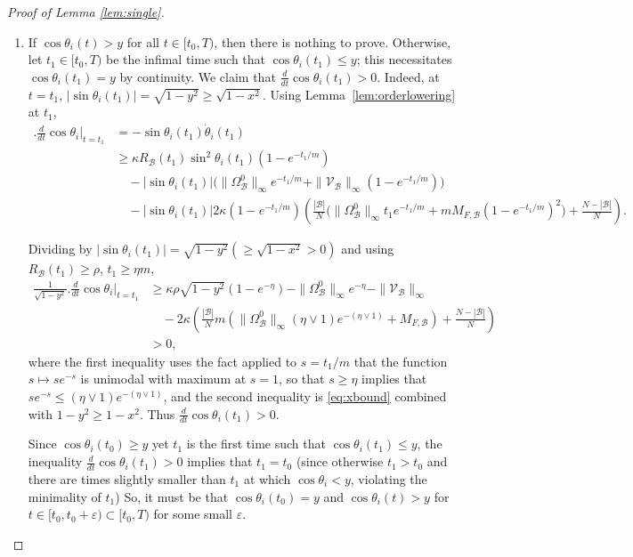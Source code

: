 \documentclass[11pt,reqno]{amsart}
\theoremstyle{definition}
\theoremstyle{remark}
\begin{document}
\begin{proof}[Proof of Lemma \ref{lem:single}]
	\,
\begin{enumerate}
\item 
If $\cos\theta_i(t)>y$ for all $t\in [t_0,T)$, then there is nothing to prove. Otherwise, let $t_1\in[t_0,T)$ be the infimal time  such that
$\cos\theta_i(t_1)\le y$; this necessitates $\cos\theta_i(t_1)=y$ by continuity. We claim that $\frac{d}{dt}\cos\theta_i(t_1)>0$. Indeed, at $t=t_1$, $|\sin\theta_i(t_1)|=\sqrt{1-y^2}\ge\sqrt{1-x^2}$. Using
Lemma~\ref{lem:orderlowering} at $t_1$,
\begin{align*}
\bigl.\tfrac{d}{dt}\cos\theta_i\bigr|_{t=t_1}
&=-\sin\theta_i(t_1)\dot\theta_i(t_1)\\
&\ge \kappa R_\mathcal{B}(t_1)\sin^2\theta_i(t_1)(1-e^{-t_1/m})\\
&\quad-|\sin\theta_i(t_1)|\bigl(\|\Omega_\mathcal{B}^0\|_\infty e^{-t_1/m}+\|\mathcal V_\mathcal{B}\|_\infty(1-e^{-t_1/m})\bigr)\\
&\quad-|\sin\theta_i(t_1)|2\kappa (1-e^{-t_1/m})\left(\frac{|\mathcal{B}|}{N}\bigl(\|\Omega_\mathcal{B}^0\|_\infty t_1 e^{-t_1/m}+m M_{F,\mathcal{B}}(1-e^{-t_1/m})^2\bigr)+\frac{N-|\mathcal{B}|}{N}\right).
\end{align*}

Dividing by $|\sin\theta_i(t_1)|=\sqrt{1-y^2}(\ge\sqrt{1-x^2}>0)$ and using
$R_\mathcal{B}(t_1)\ge\rho$, $t_1\ge\eta m$,
\begin{align*}
\frac{1}{\sqrt{1-y^2}}\bigl.\tfrac{d}{dt}\cos\theta_i\bigr|_{t=t_1}
&\ge \kappa\rho\sqrt{1-y^2}(1-e^{-\eta})-\|\Omega_\mathcal{B}^0\|_\infty e^{-\eta}-\|\mathcal V_\mathcal{B}\|_\infty\\
&\quad-2\kappa\left(\frac{|\mathcal{B}|}{N}m\left(\|\Omega_\mathcal{B}^0\|_\infty(\eta\vee 1)e^{-(\eta\vee 1)}+ M_{F,\mathcal{B}}\right)+\frac{N-|\mathcal{B}|}{N}\right)\\
&>0,
\end{align*}
where the first inequality uses the fact applied to $s=t_1/m$ that the function $s\mapsto se^{-s}$ is unimodal with maximum at $s=1$, so that $s\ge \eta$ implies that $se^{-s}\le (\eta\vee 1)e^{-(\eta\vee 1)}$, and
the second inequality is \eqref{eq:xbound} combined with $1-y^2\ge 1-x^2$. Thus
$\frac{d}{dt}\cos\theta_i(t_1)>0$.

Since $\cos\theta_i(t_0)\ge y$ yet $t_1$ is the first time such that $\cos\theta_i(t_1)\le y$, the inequality $\frac{d}{dt}\cos\theta_i(t_1)>0$ implies that $t_1=t_0$ (since otherwise $t_1>t_0$ and there are times slightly smaller than $t_1$ at which $\cos \theta_i<y$, violating the minimality of $t_1$) So, it must be that $\cos\theta_i(t_0)=y$ and $\cos\theta_i(t)>y$ for $t\in [t_0,t_0+\varepsilon)\subset [t_0,T)$ for some small $\varepsilon$.


\end{enumerate}
\end{proof}
\end{document}
